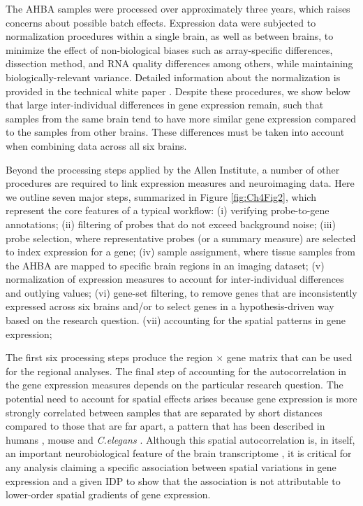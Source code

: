 \documentclass[10pt,A4]{article}
\begin{document}
The AHBA samples were processed over approximately three years, which raises concerns about possible batch effects. Expression data were subjected to normalization procedures within a single brain, as well as between brains, to minimize the effect of non-biological biases such as array-specific differences, dissection method, and RNA quality differences among others, while maintaining biologically-relevant variance. Detailed information about the normalization is provided in the technical white paper \citep{AHBAdoc}. Despite these procedures, we show below that large inter-individual differences in gene expression remain, such that samples from the same brain tend to have more similar gene expression compared to the samples from other brains. These differences must be taken into account when combining data across all six brains.

Beyond the processing steps applied by the Allen Institute, a number of other procedures are required to link expression measures and neuroimaging data. Here we outline seven major steps, summarized in Figure \ref{fig:Ch4Fig2}, which represent the core features of a typical workflow:
(i) verifying probe-to-gene annotations;
(ii) filtering of probes that do not exceed background noise;
(iii) probe selection, where representative probes (or a summary measure) are selected to index expression for a gene;
(iv) sample assignment, where tissue samples from the AHBA are mapped to specific brain regions in an imaging dataset;
(v) normalization of expression measures to account for inter-individual differences and outlying values;
(vi) gene-set filtering, to remove genes that are inconsistently expressed across six brains and/or to select genes in a hypothesis-driven way based on the research question.
(vii) accounting for the spatial patterns in gene expression;

The first six processing steps produce the region $\times$ gene matrix that can be used for the regional analyses.
The final step of accounting for the autocorrelation in the gene expression measures depends on the particular research question.
The potential need to account for spatial effects arises because gene expression is more strongly correlated between samples that are separated by short distances compared to those that are far apart, a pattern that has been described in humans
\citep{Richiardi2015,Krienen2016,Vertes2016b,Pantazatos2017}, mouse \citep{Fulcher2016} and \textit{C.elegans} \citep{Arnatkeviciute2018}.
Although this spatial autocorrelation is, in itself, an important neurobiological feature of the brain transcriptome \citep{Gryglewski2018, Fornito2018},
it is critical for any analysis claiming a specific association between spatial variations in gene expression and a given IDP to show that the association is not attributable to lower-order spatial gradients of gene expression.
\end{document}
